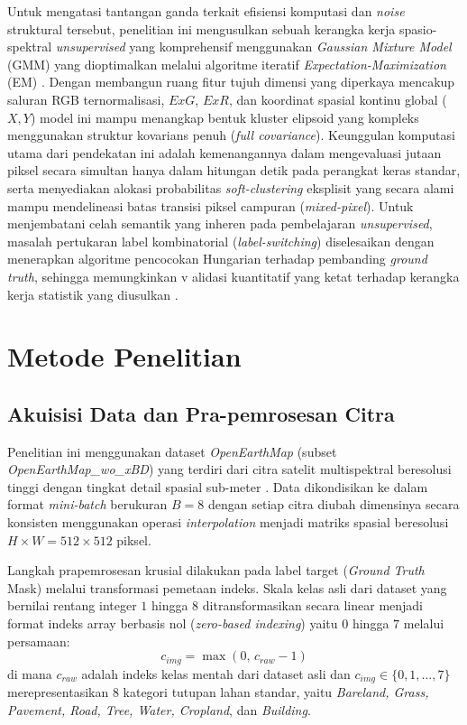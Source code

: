\documentclass[11pt,twoside]{article}
\begin{document}
Untuk mengatasi tantangan ganda terkait efisiensi komputasi dan \textit{noise} struktural 
tersebut, penelitian ini mengusulkan sebuah kerangka kerja spasio-spektral 
\textit{unsupervised} yang komprehensif menggunakan \textit{Gaussian Mixture Model} 
(GMM) yang dioptimalkan melalui algoritme iteratif \textit{Expectation-Maximization} 
(EM) \cite{dempster1977maximum}. Dengan membangun ruang fitur tujuh dimensi yang 
diperkaya mencakup saluran RGB ternormalisasi, $ExG$, $ExR$, dan koordinat spasial 
kontinu global ($X, Y$) model ini mampu menangkap bentuk kluster elipsoid yang 
kompleks menggunakan struktur kovarians penuh (\textit{full covariance}). 
Keunggulan komputasi utama dari pendekatan ini adalah kemenangannya dalam 
mengevaluasi jutaan piksel secara simultan hanya dalam hitungan detik pada perangkat 
keras standar, serta menyediakan alokasi probabilitas \textit{soft-clustering} eksplisit 
yang secara alami mampu mendelineasi batas transisi piksel 
campuran (\textit{mixed-pixel}). Untuk menjembatani celah semantik yang inheren 
pada pembelajaran \textit{unsupervised}, masalah pertukaran label 
kombinatorial (\textit{label-switching}) diselesaikan dengan menerapkan algoritme 
pencocokan Hungarian terhadap pembanding \textit{ground truth}, sehingga memungkinkan v
alidasi kuantitatif yang ketat terhadap kerangka kerja statistik yang 
diusulkan \cite{kuhn1955hungarian}.

\section{Metode Penelitian}
\label{Sec:Method}

\subsection{Akuisisi Data dan Pra-pemrosesan Citra}
Penelitian ini menggunakan dataset \textit{OpenEarthMap} (subset \textit{OpenEarthMap\_wo\_xBD}) yang terdiri dari citra satelit multispektral beresolusi tinggi dengan tingkat detail spasial sub-meter \cite{tokula2022openearthmap}. Data dikondisikan ke dalam format \textit{mini-batch} berukuran $B = 8$ dengan setiap citra diubah dimensinya secara konsisten menggunakan operasi \textit{interpolation} menjadi matriks spasial beresolusi $H \times W = 512 \times 512$ piksel. 

Langkah prapemrosesan krusial dilakukan pada label target (\textit{Ground Truth} Mask) melalui transformasi pemetaan indeks. Skala kelas asli dari dataset yang bernilai rentang integer $1$ hingga $8$ ditransformasikan secara linear menjadi format indeks array berbasis nol (\textit{zero-based indexing}) yaitu $0$ hingga $7$ melalui persamaan:
\begin{equation}
    c_{img} = \max(0, \, c_{raw} - 1)
\end{equation}
di mana $c_{raw}$ adalah indeks kelas mentah dari dataset asli dan $c_{img} \in \{0, 1, \dots, 7\}$ merepresentasikan 8 kategori tutupan lahan standar, yaitu \textit{Bareland, Grass, Pavement, Road, Tree, Water, Cropland}, dan \textit{Building}.
\end{document}
